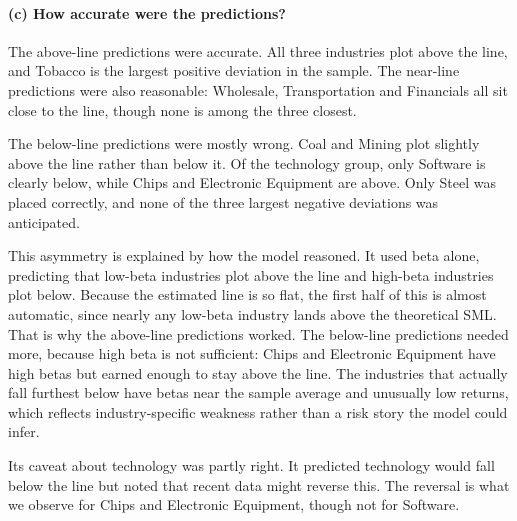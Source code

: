 \paragraph{(c) How accurate were the predictions?} The above-line predictions
were accurate. All three industries plot above the line, and Tobacco is the
largest positive deviation in the sample. The near-line predictions were also
reasonable: Wholesale, Transportation and Financials all sit close to the line,
though none is among the three closest.

The below-line predictions were mostly wrong. Coal and Mining plot slightly
above the line rather than below it. Of the technology group, only Software is
clearly below, while Chips and Electronic Equipment are above. Only Steel was
placed correctly, and none of the three largest negative deviations was
anticipated.

This asymmetry is explained by how the model reasoned. It used beta alone,
predicting that low-beta industries plot above the line and high-beta
industries plot below. Because the estimated line is so flat, the first half of
this is almost automatic, since nearly any low-beta industry lands above the
theoretical SML. That is why the above-line predictions worked. The below-line
predictions needed more, because high beta is not sufficient: Chips and
Electronic Equipment have high betas but earned enough to stay above the line.
The industries that actually fall furthest below have betas near the sample
average and unusually low returns, which reflects industry-specific weakness
rather than a risk story the model could infer.

Its caveat about technology was partly right. It predicted technology would
fall below the line but noted that recent data might reverse this. The reversal
is what we observe for Chips and Electronic Equipment, though not for Software.
